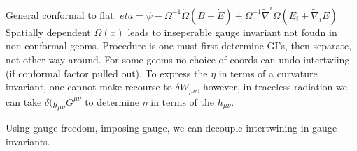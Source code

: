 General conformal to flat. $eta=\psi -\Omega^{-1}\dot{\Omega}(B-\dot E)+\Omega^{-1}\tilde\nabla^i\Omega(E_i+\tilde\nabla_i E)$ Spatially dependent $\Omega(x)$ leads to inseperable gauge invariant not foudn in non-conformal geoms. Procedure is one must first determine GI's, then separate, not other way around. For some geoms no choice of coords can undo intertwiing (if conformal factor pulled out). To express the $\eta$ in terms of a curvature invariant, one cannot make recourse to $\delta W_{\mu\nu}$, however, in traceless radiation we can take $\delta(g_{\mu\nu}G^{\mu\nu}$ to determine $\eta$ in terms of the $h_{\mu\nu}$. 

Using gauge freedom, imposing gauge, we can decouple intertwining in gauge invariants. 